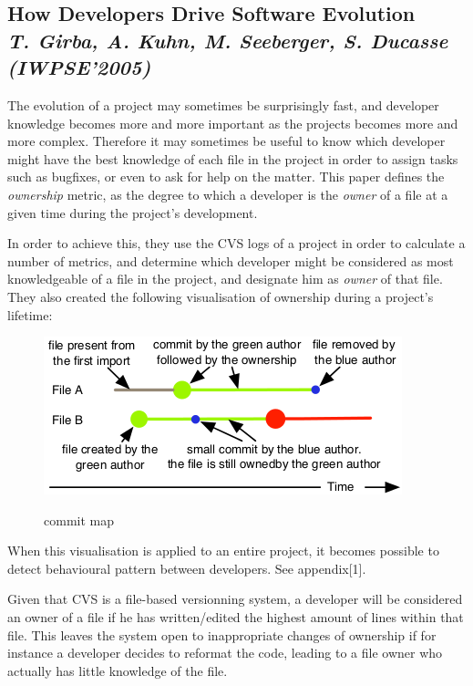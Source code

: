 \subsection{How Developers Drive Software Evolution\\ \textit{T. Girba, A. Kuhn, M. Seeberger, S. Ducasse (IWPSE'2005)}}

The evolution of a project may sometimes be surprisingly fast, and developer knowledge becomes more and more important as the projects becomes more and more complex. Therefore it may sometimes be useful to know which developer might have the best knowledge of each file in the project in order to assign tasks such as bugfixes, or even to ask for help on the matter.
This paper defines the \emph{ownership} metric, as the degree to which a developer is the \emph{owner} of a file at a given time during the project's development\cite{Girba2005}.

In order to achieve this, they use the CVS logs of a project in order to calculate a number of metrics, and determine which developer might be considered as most knowledgeable of a file in the project, and designate him as \emph{owner} of that file.
They also created the following visualisation of ownership during a project's lifetime:

\begin{figure}[H]
\includegraphics[keepaspectratio=true,scale=0.5]{./resources/girba2005.png}~
\caption{commit map}
\label{fig:commit_map}
\end{figure}

When this visualisation is applied to an entire project, it becomes possible to detect behavioural pattern between developers. See appendix[1].

Given that CVS is a file-based versionning system, a developer will be considered an owner of a file if he has written/edited the highest amount of lines within that file. This leaves the system open to inappropriate changes of ownership if for instance a developer decides to reformat the code, leading to a file owner who actually has little knowledge of the file.

